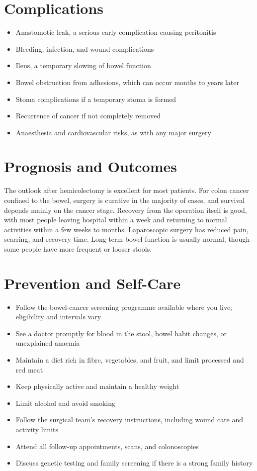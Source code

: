 \section*{Complications}
\begin{itemize}
    \item Anastomotic leak, a serious early complication causing peritonitis
    \item Bleeding, infection, and wound complications
    \item Ileus, a temporary slowing of bowel function
    \item Bowel obstruction from adhesions, which can occur months to years later
    \item Stoma complications if a temporary stoma is formed
    \item Recurrence of cancer if not completely removed
    \item Anaesthesia and cardiovascular risks, as with any major surgery
\end{itemize}

\section*{Prognosis and Outcomes}
The outlook after hemicolectomy is excellent for most patients. For colon cancer confined to the bowel, surgery is curative in the majority of cases, and survival depends mainly on the cancer stage. Recovery from the operation itself is good, with most people leaving hospital within a week and returning to normal activities within a few weeks to months. Laparoscopic surgery has reduced pain, scarring, and recovery time. Long-term bowel function is usually normal, though some people have more frequent or looser stools.

\section*{Prevention and Self-Care}
\begin{itemize}
    \item Follow the bowel-cancer screening programme available where you live; eligibility and intervals vary
    \item See a doctor promptly for blood in the stool, bowel habit changes, or unexplained anaemia
    \item Maintain a diet rich in fibre, vegetables, and fruit, and limit processed and red meat
    \item Keep physically active and maintain a healthy weight
    \item Limit alcohol and avoid smoking
    \item Follow the surgical team's recovery instructions, including wound care and activity limits
    \item Attend all follow-up appointments, scans, and colonoscopies
    \item Discuss genetic testing and family screening if there is a strong family history
\end{itemize}

